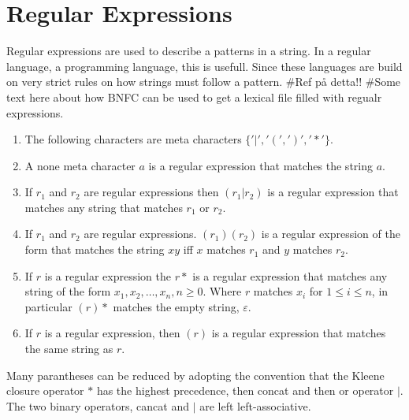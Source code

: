 \section{Regular Expressions}
Regular expressions are used to describe a patterns in a string.
In a regular language, a programming language, this is usefull.
Since these languages are build on very strict rules on how strings
must follow a pattern. \#Ref på detta!! 
\#Some text here about how BNFC can be used to get a lexical file filled with
regualr expressions. 
\begin{definition}
\begin{enumerate}
  \item The following characters are meta characters $\{ '|', '(', ')', '*' \}$.
  \item A none meta character $a$ is a regular expression that matches the 
      string $a$.
  \item If $r_1$ and $r_2$ are regular expressions then $(r_1 | r_2)$ is a 
      regular expression that matches any string that matches $r_1$ or $r_2$.
  \item If $r_1$ and $r_2$ are regular expressions. $(r_1)(r_2)$ is a regular
      expression of the form that matches the string $xy$ iff $x$ matches $r_1$
      and $y$ matches $r_2$.
  \item If $r$ is a regular expression the $r*$ is a regular expression that
      matches any string of the form $x_1, x_2, \dots , x_n, n \geq 0$.
      Where $r$ matches $x_i$ for $1 \leq i \leq n$, in particular $(r)*$ 
      matches the empty string, $\varepsilon$.
  \item If $r$ is a regular expression, then $(r)$ is a regular expression that
      matches the same string as $r$.
\end{enumerate}
\end{definition}
Many parantheses can be reduced by adopting the convention that the Kleene
closure operator $*$ has the highest precedence, then concat and then or
operator $|$. The two binary operators, cancat and $|$ are left 
left-associative. \cite{Aho1990}
